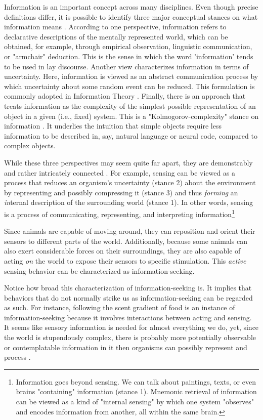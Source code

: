 Information is an important concept across many disciplines. Even though precise definitions differ, it is possible to identify three major conceptual stances on what information means \cite{adriaans_introduction_2008}. According to one perspective, information refers to declarative descriptions of the mentally represented world, which can be obtained, for example, through empirical observation, linguistic communication, or "armchair" deduction. This is the sense in which the word 'information' tends to be used in lay discourse. Another view characterizes information in terms of uncertainty. Here, information is viewed as an abstract communication process by which uncertainty about some random event can be reduced. This formulation is commonly adopted in Information Theory \cite{shannon_mathematical_1948}. Finally, there is an approach that treats information as the complexity of the simplest possible representation of an object in a given (i.e., fixed) system. This is a "Kolmogorov-complexity" stance on information \cite{kolmogorov1965three}. It underlies the intuition that simple objects require less information to be described in, say, natural language or neural code, compared to complex objects.

While these three perspectives may seem quite far apart, they are demonstrably and rather intricately connected \cite{adriaans_introduction_2008}. For example, sensing can be viewed as a process that reduces an organism's uncertainty (stance 2) about the environment by representing and possibly compressing it (stance 3) and thus \emph{forming} an \emph{in}ternal description of the surrounding world (stance 1). In other words, sensing is a process of communicating, representing, and interpreting information\footnote{Information goes beyond sensing. We can talk about paintings, texts, or even brains "containing" information (stance 1). Mnemonic retrieval of information can be viewed as a kind of "internal sensing" by which one system "observes" and encodes information from another, all within the same brain.}

Since animals are capable of moving around, they can reposition and orient their sensors to different parts of the world. Additionally, because some animals can also exert considerable forces on their surroundings, they are also capable of acting \emph{on} the world to expose their sensors to specific stimulation. This \emph{active} sensing behavior can be characterized as information-seeking. 

Notice how broad this characterization of information-seeking is. It implies that behaviors that do not normally strike us as information-seeking can be regarded as such. For instance, following the scent gradient of food is an instance of information-seeking because it involves interactions between acting and sensing. It seems like sensory information is needed for almost everything we do, yet, since the world is stupendously complex, there is probably more potentially observable or contemplatable information in it then organisms can possibly represent and process \cite{kolmogorov1965three}. 

